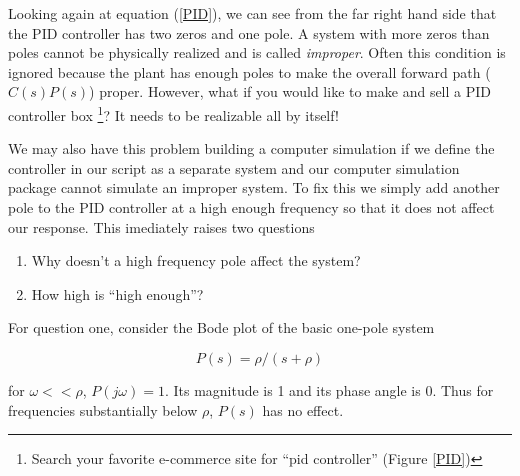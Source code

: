 %
%


Looking again at equation (\ref{PID}), we can see from the far right hand side that the PID controller has two zeros and one pole.   A system with more zeros than poles cannot be physically realized and is called {\it improper}.   Often this condition is ignored because the plant has enough poles to make the overall forward path ($C(s)P(s)$) proper.  However, what if you would like to make and sell a PID controller box
\footnote{Search your favorite e-commerce site for ``pid controller'' (Figure \ref{PID})}?
It needs to be realizable all by itself!


We may also have this problem building a computer simulation if we define the controller in our script as a separate system and our computer simulation package    cannot simulate an improper system.
To fix this we simply add another pole to the PID controller at a high enough frequency so that it does not affect our response.  This imediately raises two questions




\begin{enumerate}
  \item Why doesn't a high frequency pole affect the system?
  \item How high is ``high enough''?
\end{enumerate}






For question one, consider the Bode plot of the basic one-pole system	%


\[
P(s) = \rho/(s+\rho)
\]

for $\omega << \rho$, $P(j\omega) = 1$.  Its magnitude is 1 and its phase angle is 0.
Thus for frequencies substantially below $\rho$, $P(s)$ has no effect.	%

